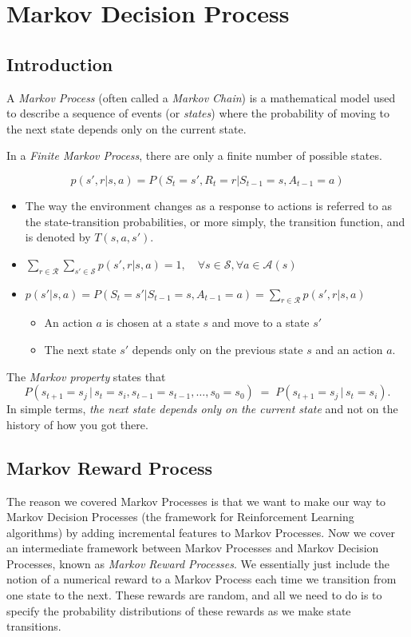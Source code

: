 \chapter{Markov Decision Process}

\section{Introduction}

A \textit{Markov Process} (often called a \textit{Markov Chain}) is a mathematical model used to describe a sequence of events (or \textit{states}) where the probability of moving to the next state depends only on the current state. 

In a \textit{Finite Markov Process}, there are only a finite number of possible states. 

\begin{definition}
	$$p(s',r|s,a) = P(S_t=s',R_t=r|S_{t-1}=s,A_{t-1}=a)$$
\end{definition}
\begin{itemize}
	\item The way the environment changes as a response to actions is referred to as the state-transition probabilities, or more simply, the transition function, and is denoted by $T(s,a,s')$.
	\item $\sum_{r\in \mathcal{R}}\sum_{s'\in \mathcal{S}}p(s',r|s,a) = 1, \quad \forall s \in \mathcal{S}, \forall a\in \mathcal{A}(s)$
	\item $p(s'|s,a)=P(S_t=s'|S_{t-1}=s,A_{t-1}=a)=\sum_{r\in \mathcal{R}}p(s',r|s,a)$
		\begin{itemize}
			\item An action $a$ is chosen at a state $s$ and move to a state $s'$
			\item The next state $s'$ depends only on the previous state $s$ and an action $a$.
		\end{itemize}
\end{itemize}

The \textit{Markov property} states that 
\[
P(s_{t+1} = s_j \,\big\vert\, s_t = s_i, s_{t-1} = s_{t-1}, \dots, s_0 = s_0 )
\;=\;
P(s_{t+1} = s_j \,\big\vert\, s_t = s_i).
\]
In simple terms, \textit{the next state depends only on the current state} and not on the history of how you got there.


\section{Markov Reward Process}
The reason we covered Markov Processes is that we want to make our way to Markov Decision Processes (the framework for Reinforcement Learning algorithms) by adding incremental features to Markov Processes. Now we cover an intermediate framework between Markov Processes and Markov Decision Processes, known as \textit{Markov Reward Processes}. We essentially just include the notion of a numerical reward to a Markov Process each time we transition from one state to the next. These rewards are random, and all we need to do is to specify the probability distributions of these rewards as we make state transitions.

